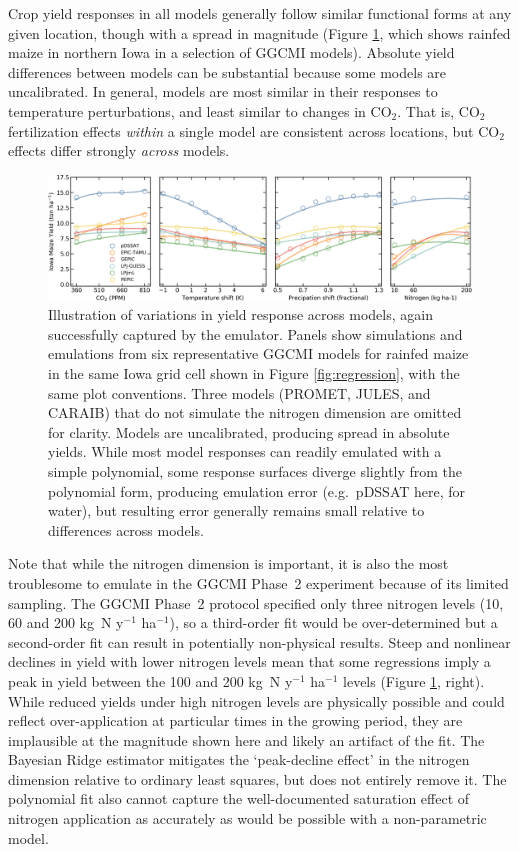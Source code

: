 \documentclass[gmdd]{copernicus} %
\begin{document}
Crop yield responses in all models generally follow similar functional forms at any given location, though with a spread in magnitude (Figure \ref{fig:regression_2}, which shows rainfed maize in northern Iowa in a selection of GGCMI models). 
Absolute yield differences between models can be substantial because some models are uncalibrated.
In general, models are most similar in their responses to temperature perturbations, and least similar to changes in CO$_2$. 
That is, CO$_2$ fertilization effects \textit{within} a single model are consistent across locations, but CO$_2$ effects differ strongly \textit{across} models. 

\begin{figure}[h!!]
\centering
    \includegraphics[width=16.3cm]{figures/regression_example_2.png}
    \caption{
    Illustration of variations in yield response across models, again successfully captured by the emulator. 
    Panels show simulations and emulations from six representative GGCMI models for rainfed maize in the same Iowa grid cell shown in Figure \ref{fig:regression}, with the same plot conventions. 
    Three models (PROMET, JULES, and CARAIB) that do not simulate the nitrogen dimension are omitted for clarity. 
    Models are uncalibrated, producing spread in absolute yields. 
    While most model responses can readily emulated with a simple polynomial, some response surfaces diverge slightly from the polynomial form, producing emulation error (e.g.\ pDSSAT here, for water), but 
    resulting error generally remains small relative to differences across models.
    }
   \label{fig:regression_2}
\end{figure}

Note that while the nitrogen dimension is important, it is also the most troublesome to emulate in the GGCMI Phase~2 experiment because of its limited sampling. 
The GGCMI Phase~2 protocol specified only three nitrogen levels (10, 60 and 200 kg~N y$^{-1}$ ha$^{-1}$), so a third-order fit would be over-determined but a second-order fit can result in potentially non-physical results. 
Steep and nonlinear declines in yield with lower nitrogen levels mean that some regressions imply a peak in yield between the 100 and 200 kg~N y$^{-1}$ ha$^{-1}$ levels (Figure \ref{fig:regression_2}, right). 
While reduced yields under high nitrogen levels are physically possible and could reflect over-application at particular times in the growing period, they are implausible at the magnitude shown here and likely an artifact of the fit. 
The Bayesian Ridge estimator mitigates the `peak-decline effect' in the nitrogen dimension relative to ordinary least squares, but does not entirely remove it. 
The polynomial fit also cannot capture the well-documented saturation effect of nitrogen application \citep[e.g.][]{Torsten77} as accurately as would be possible with a non-parametric model. 
\end{document}
